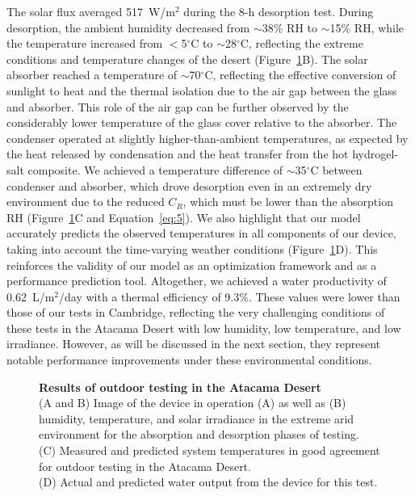 \documentclass[11pt]{article}
\begin{document}
The solar flux averaged 517~W/m$^2$ during the 8-h desorption test. During desorption, the ambient humidity decreased from $\sim$38\% RH to $\sim$15\% RH, while the temperature increased from $<$5$^\circ$C to $\sim$28$^\circ$C, reflecting the extreme conditions and temperature changes of the desert (Figure~\ref{fig:fig4}B). The solar absorber reached a temperature of $\sim$70$^\circ$C, reflecting the effective conversion of sunlight to heat and the thermal isolation due to the air gap between the glass and absorber. This role of the air gap can be further observed by the considerably lower temperature of the glass cover relative to the absorber. The condenser operated at slightly higher-than-ambient temperatures, as expected by the heat released by condensation and the heat transfer from the hot hydrogel-salt composite. We achieved a temperature difference of $\sim$35$^\circ$C between condenser and absorber, which drove desorption even in an extremely dry environment due to the reduced $C_R$, which must be lower than the absorption RH (Figure~\ref{fig:fig4}C and Equation~\ref{eq:5}). We also highlight that our model accurately predicts the observed temperatures in all components of our device, taking into account the time-varying weather conditions (Figure~\ref{fig:fig4}D). This reinforces the validity of our model as an optimization framework and as a performance prediction tool. Altogether, we achieved a water productivity of 0.62~L/m$^2$/day with a thermal efficiency of 9.3\%. These values were lower than those of our tests in Cambridge, reflecting the very challenging conditions of these tests in the Atacama Desert with low humidity, low temperature, and low irradiance. However, as will be discussed in the next section, they represent notable performance improvements under these environmental conditions.

\begin{figure}[t]
\centering
{}
\caption{\textbf{Results of outdoor testing in the Atacama Desert} \\
(A and B) Image of the device in operation (A) as well as (B) humidity, temperature, and solar irradiance in the extreme arid environment for the absorption and desorption phases of testing. \\
(C) Measured and predicted system temperatures in good agreement for outdoor testing in the Atacama Desert. \\
(D) Actual and predicted water output from the device for this test.}
\label{fig:fig4}
\end{figure}
\end{document}
